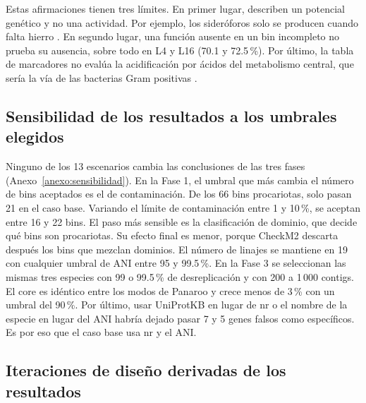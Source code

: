 \begin{nuevo}
Estas afirmaciones tienen tres límites. En primer lugar, describen un
potencial genético y no una actividad. Por ejemplo, los sideróforos solo se
producen cuando falta hierro \cite{dalvie2026}. En segundo lugar, una función
ausente en un bin incompleto no prueba su ausencia, sobre todo en L4 y L16
(70.1 y 72.5\,\%). Por último, la tabla de marcadores no evalúa la
acidificación por ácidos del metabolismo central, que sería la vía de las
bacterias Gram positivas \cite{uroz2026}.
\end{nuevo}

\subsection{Sensibilidad de los resultados a los umbrales elegidos}
\label{subsec:sensibilidad}

Ninguno de los 13 escenarios cambia las conclusiones de las tres fases
(Anexo~\ref{anexo:sensibilidad}). En la Fase 1, el umbral que más cambia el número de bins aceptados es el de
contaminación. De los 66 bins procariotas, solo pasan 21 en el caso base.
Variando el límite de contaminación entre 1 y 10\,\%, se aceptan entre 16 y 22
bins. El paso más sensible es la clasificación de dominio, que decide qué bins son
procariotas. Su efecto final es menor, porque CheckM2 descarta después los bins
que mezclan dominios. El número de linajes se mantiene en 19 con
cualquier umbral de ANI entre 95 y 99.5\,\%. En la Fase 3 se seleccionan las
mismas tres especies con 99 o 99.5\,\% de desreplicación y con 200 a 1\,000
contigs. El core es idéntico entre los modos de Panaroo y crece menos de
3\,\% con un umbral del 90\,\%. Por último, usar UniProtKB en lugar de nr o el
nombre de la especie en lugar del ANI habría dejado pasar 7 y 5 genes falsos
como específicos. Es por eso que el caso base usa nr y el ANI. 

\subsection{Iteraciones de diseño derivadas de los resultados}
\label{subsec:iteraciones}

